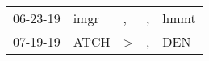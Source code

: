 \begin{supertabular}{lllll}
 06-23-19 &  imgr &             , &  , &  hmmt \\
 07-19-19 &  ATCH &  \textgreater &  , &   DEN \\
\end{supertabular}

